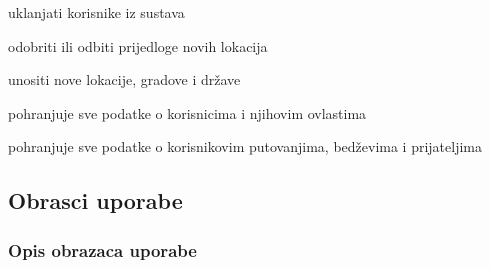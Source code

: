 \begin{packed_enum}
\begin{packed_enum}
					\item uklanjati korisnike iz sustava
					\item odobriti ili odbiti prijedloge novih lokacija
					\item unositi nove lokacije, gradove i države
					
				\end{packed_enum}
				
				\item  {}
				
				\begin{packed_enum}
					
					\item pohranjuje sve podatke o korisnicima i njihovim ovlastima
					\item pohranjuje sve podatke o korisnikovim putovanjima, bedževima i prijateljima
					
				\end{packed_enum}
			\end{packed_enum}
			
			\eject 
			
			
				
			\subsection{Obrasci uporabe}
				
				
				\subsubsection{Opis obrazaca uporabe}

